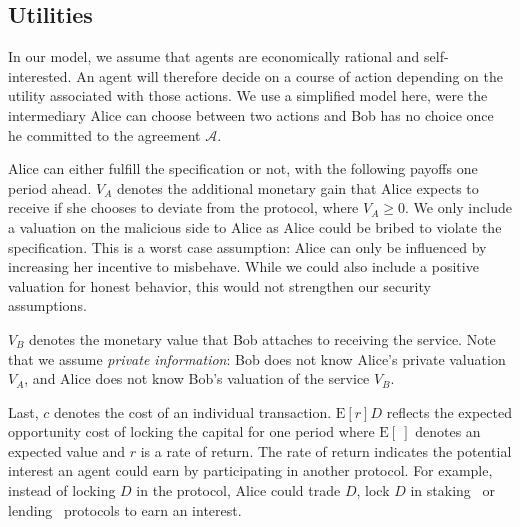 \documentclass[runningheads]{llncs}
\newcommand{\rk}[1]{\todo[linecolor=red,backgroundcolor=red!25,bordercolor=blue,inline,caption={}]{Comment by Rami: #1}}
\newcommand{\dom}[1]{\todo[linecolor=green,backgroundcolor=green!25,bordercolor=green,inline,caption={}]{Comment by Dominik: #1}}
\begin{document}
\subsection{Utilities}
In our model, we assume that agents are economically rational and self-interested.
An agent will therefore decide on a course of action depending on the utility associated with those actions.
We use a simplified model here, were the intermediary Alice can choose between two actions and Bob has no choice once he committed to the agreement $\mathcal{A}$.

Alice can either fulfill the specification or not, with the following payoffs one period ahead.
$V_A$ denotes the additional monetary gain that Alice expects to receive if she chooses to deviate from the protocol, where $V_A \geq 0$.
We only include a valuation on the malicious side to Alice as Alice could be bribed to violate the specification.
This is a worst case assumption: Alice can only be influenced by increasing her incentive to misbehave.
While we could also include a positive valuation for honest behavior, this would not strengthen our security assumptions.

$V_B$ denotes the monetary value that Bob attaches to receiving the service.
Note that we assume \emph{private information}: Bob does not know Alice's private valuation $V_A$, and Alice does not know Bob's valuation of the service $V_B$.

Last, $c$ denotes the cost of an individual transaction. 
$\mathrm{E}[r]D$ reflects the expected opportunity cost of locking the capital for one period where $\mathrm{E}[~]$ denotes an expected value and $r$ is a rate of return.
The rate of return indicates the potential interest an agent could earn by participating in another protocol.
For example, instead of locking $D$ in the protocol, Alice could trade $D$, lock $D$ in staking~\cite{Fanti2019Compounding} or lending~\cite{online:makerdao} protocols to earn an interest.
\end{document}
